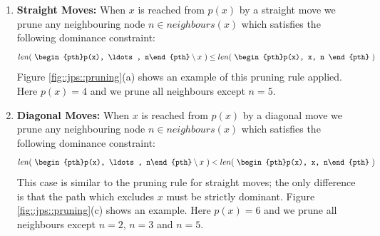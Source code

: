 \begin{enumerate}
\item {
\textbf{Straight Moves: } 
When $x$ is reached from $p(x)$ by a straight move we prune any neighbouring node 
$n \in neighbours(x)$ which satisfies the following dominance constraint:
\begin{equation}
len(~\begin{pth}p(x), \ldots, n\end{pth} \setminus x~)
\leq len(~\begin{pth}p(x), x, n \end{pth}~)
\end{equation}
Figure \ref{fig::jps::pruning}(a) shows an example of this pruning rule applied. Here $p(x) = 4$ and we prune
 all neighbours except $n = 5$.
}

\item{
\textbf{Diagonal Moves: }
When $x$ is reached from $p(x)$ by a diagonal move we prune any neighbouring node 
$n \in neighbours(x)$ which satisfies the following dominance constraint:
\begin{equation}
len(~\begin{pth}p(x), \ldots, n\end{pth} \setminus x~) < len(~\begin{pth}p(x), x, n\end{pth}~)
\end{equation}
This case is similar to the pruning rule for straight moves; the only difference is that 
the path which excludes $x$ must 
be strictly dominant. Figure \ref{fig::jps::pruning}(c) shows an example. 
Here $p(x) = 6$ and we prune all
neighbours except $n = 2$, $n = 3$ and $n = 5$.  
}
\end{enumerate}

